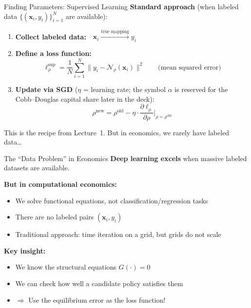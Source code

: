 \documentclass[aspectratio=169,11pt]{beamer}
\newcommand{\emphc}[1]{\textcolor{harvardcrimson}{#1}}
\newcommand{\x}{\bm{x}}
\begin{document}
\begin{frame}{Finding Parameters: Supervised Learning}
\textbf{Standard approach} (when labeled data $\{(\x_i, y_i)\}_{i=1}^N$ are available):

\vspace{0.5em}
\begin{enumerate}
    \item \textbf{Collect labeled data:}~~$\x_i \xrightarrow{\text{true mapping}} y_i$

    \vspace{0.3em}
    \item \textbf{Define a loss function:}
    \[
    \ell_\rho^{\text{sup}} = \frac{1}{N}\sum_{i=1}^{N} \bigl\|y_i - \mathcal{N}_\rho(\x_i)\bigr\|^2
    \qquad\text{(mean squared error)}
    \]

    \vspace{0.3em}
    \item \textbf{Update via SGD} ($\eta$ = learning rate; the symbol $\alpha$ is reserved for the Cobb--Douglas capital share later in the deck):
    \[
    \rho^{\text{new}} = \rho^{\text{old}} - \eta \cdot \frac{\partial \ell_\rho}{\partial \rho}\bigg|_{\rho = \rho^{\text{old}}}
    \]
\end{enumerate}

\vspace{0.3em}
{\small This is the recipe from Lecture~1. But in economics, \emphc{we rarely have labeled data}\ldots}
\end{frame}

\begin{frame}{The ``Data Problem'' in Economics}
\textbf{Deep learning excels} when massive labeled datasets are available.

\vspace{0.5em}
\textbf{But in computational economics:}
\begin{itemize}
    \item We solve \emphc{functional equations}, not classification/regression tasks
    \item There are \emphc{no labeled pairs} $(\x_i, y_i)$
    \item Traditional approach: \emphc{time iteration on a grid}, but grids do not scale
\end{itemize}

\vspace{0.5em}
\textbf{Key insight:}
\begin{itemize}
    \item We \emphc{know} the structural equations $G(\cdot) = 0$
    \item We can \emphc{check} how well a candidate policy satisfies them
    \item $\Rightarrow$ Use the \emphc{equilibrium error} as the loss function!
\end{itemize}
\end{frame}
\end{document}
